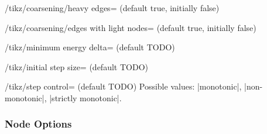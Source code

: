 \begin{key}{/tikz/coarsening/heavy edges= (default
  true, initially false)}
  \begin{codeexample}[]
  \end{codeexample}
\end{key}

\begin{key}{/tikz/coarsening/edges with light nodes=
  (default true, initially false)}
  \begin{codeexample}[]
  \end{codeexample}
\end{key}

\begin{key}{/tikz/minimum energy delta= (default TODO)}
  \begin{codeexample}[]
  \end{codeexample}
\end{key}

\begin{key}{/tikz/initial step size= (default TODO)}
  \begin{codeexample}[]
  \end{codeexample}
\end{key}

\begin{key}{/tikz/step control= (default TODO)}
  Possible values: |monotonic|, |non-monotonic|, |strictly monotonic|.
  \begin{codeexample}[]
  \end{codeexample}
\end{key}

\subsubsection{Node Options}


